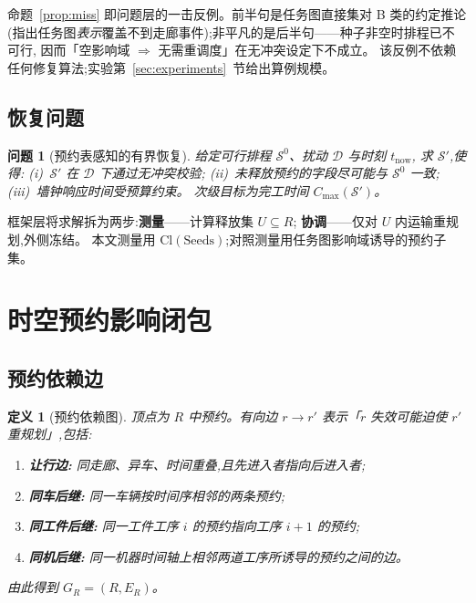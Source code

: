 \documentclass[manuscript,screen,review]{acmart}
\newtheorem{definition}{定义}
\newtheorem{problem}{问题}
\begin{document}
命题~\ref{prop:miss} 即问题层的一击反例。前半句是任务图直接集对 B 类的约定推论
(指出任务图\emph{表示}覆盖不到走廊事件);非平凡的是后半句——种子非空时排程已不可行,
因而「空影响域 \(\Rightarrow\) 无需重调度」在无冲突设定下不成立。
该反例不依赖任何修复算法;实验第~\ref{sec:experiments}~节给出算例规模。

\subsection{恢复问题}
\label{sec:recovery_problem}

\begin{problem}[预约表感知的有界恢复]
\label{prob:recovery}
给定可行排程 \(\mathcal{S}^0\)、扰动 \(\mathcal{D}\) 与时刻 \(t_{\mathrm{now}}\),
求 \(\mathcal{S}'\),使得:
(i)~\(\mathcal{S}'\) 在 \(\mathcal{D}\) 下通过无冲突校验;
(ii)~未释放预约的字段尽可能与 \(\mathcal{S}^0\) 一致;
(iii)~墙钟响应时间受预算约束。
次级目标为完工时间 \(C_{\max}(\mathcal{S}')\)。
\end{problem}

框架层将求解拆为两步:\textbf{测量}——计算释放集 \(U\subseteq R\);
\textbf{协调}——仅对 \(U\) 内运输重规划,外侧冻结。
本文测量用 \(\mathrm{Cl}(\mathrm{Seeds})\);对照测量用任务图影响域诱导的预约子集。

\section{时空预约影响闭包}
\label{sec:strc}

\subsection{预约依赖边}
\label{sec:closure_def}

\begin{definition}[预约依赖图]
\label{def:dep}
顶点为 \(R\) 中预约。有向边 \(r\to r'\) 表示「\(r\) 失效可能迫使 \(r'\) 重规划」,包括:
\begin{enumerate}[leftmargin=1.4em,itemsep=0.15em]
\item \textbf{让行边:} 同走廊、异车、时间重叠,且先进入者指向后进入者;
\item \textbf{同车后继:} 同一车辆按时间序相邻的两条预约;
\item \textbf{同工件后继:} 同一工件工序 \(i\) 的预约指向工序 \(i+1\) 的预约;
\item \textbf{同机后继:} 同一机器时间轴上相邻两道工序所诱导的预约之间的边。
\end{enumerate}
由此得到 \(G_R=(R,E_R)\)。
\end{definition}
\end{document}

